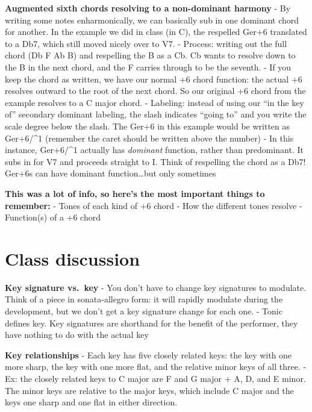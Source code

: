 \documentclass{book}
\begin{document}
\textbf{Augmented sixth chords resolving to a non-dominant harmony} - By
writing some notes enharmonically, we can basically sub in one dominant chord
for another. In the example we did in class (in C), the respelled Ger+6
translated to a Db7, which still moved nicely over to V7. - Process: writing
out the full chord (Db F Ab B) and respelling the B as a Cb. Cb wants to
resolve down to the B in the next chord, and the F carries through to be the
seventh. - If you keep the chord as written, we have our normal +6 chord
function: the actual +6 resolves outward to the root of the next chord. So our
original +6 chord from the example resolves to a C major chord. - Labeling:
instead of using our ``in the key of'' secondary dominant labeling, the slash
indicates ``going to'' and you write the scale degree below the slash. The
Ger+6 in this example would be written as Ger+6/\^{}1 (remember the caret
should be written above the number) - In this instance, Ger+6/\^{}1 actually
has \emph{dominant} function, rather than predominant. It subs in for V7 and
proceeds straight to I. Think of respelling the chord as a Db7! Ger+6s can
have dominant function\ldots but only sometimes

\textbf{This was a lot of info, so here's the most important things to
remember:} - Tones of each kind of +6 chord - How the different tones resolve
- Function(s) of a +6 chord

\hypertarget{class-discussion-16}{%
\chapter{Class discussion}\label{class-discussion-16}}

\textbf{Key signature vs.~key} - You don't have to change key signatures to
modulate. Think of a piece in sonata-allegro form: it will rapidly modulate
during the development, but we don't get a key signature change for each one.
- Tonic defines key. Key signatures are shorthand for the benefit of the
performer, they have nothing to do with the actual key

\textbf{Key relationships} - Each key has five closely related keys: the key
with one more sharp, the key with one more flat, and the relative minor keys
of all three. - Ex: the closely related keys to C major are F and G major + A,
D, and E minor. The minor keys are relative to the major keys, which include C
major and the keys one sharp and one flat in either direction.
\end{document}
